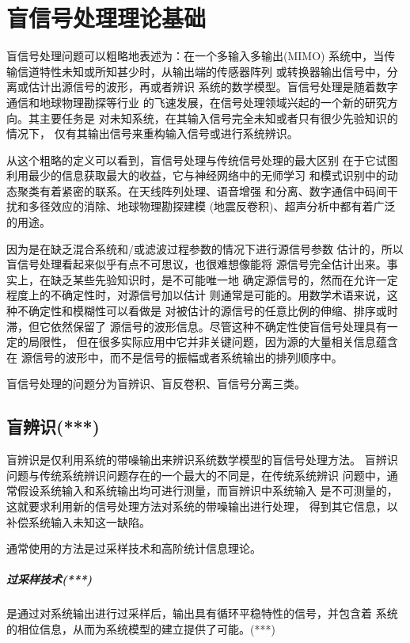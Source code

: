 ﻿%

\chapter{盲信号处理理论基础}
\label{chap01}


盲信号处理问题可以粗略地表述为：在一个多输入多输出(MIMO)
系统中，当传输信道特性未知或所知甚少时，从输出端的传感器阵列
或转换器输出信号中，分离或估计出源信号的波形，再或者辨识
系统的数学模型。盲信号处理是随着数字通信和地球物理勘探等行业
的飞速发展，在信号处理领域兴起的一个新的研究方向。其主要任务是
对未知系统，在其输入信号完全未知或者只有很少先验知识的情况下，
仅有其输出信号来重构输入信号或进行系统辨识。

从这个粗略的定义可以看到，盲信号处理与传统信号处理的最大区别
在于它试图利用最少的信息获取最大的收益，它与神经网络中的无师学习
和模式识别中的动态聚类有着紧密的联系。在天线阵列处理、语音增强
和分离、数字通信中码间干扰和多径效应的消除、地球物理勘探建模
(地震反卷积)、超声分析中都有着广泛的用途。

因为是在缺乏混合系统和/或滤波过程参数的情况下进行源信号参数
估计的，所以盲信号处理看起来似乎有点不可思议，也很难想像能将
源信号完全估计出来。事实上，在缺乏某些先验知识时，是不可能唯一地
确定源信号的，然而在允许一定程度上的不确定性时，对源信号加以估计
则通常是可能的。用数学术语来说，这种不确定性和模糊性可以看做是
对被估计的源信号的任意比例的伸缩、排序或时滞，但它依然保留了
源信号的波形信息。尽管这种不确定性使盲信号处理具有一定的局限性，
但在很多实际应用中它并非关键问题，因为源的大量相关信息蕴含在
源信号的波形中，而不是信号的振幅或者系统输出的排列顺序中。

盲信号处理的问题分为盲辨识、盲反卷积、盲信号分离三类。

\section{盲辨识(***)}
盲辨识是仅利用系统的带噪输出来辨识系统数学模型的盲信号处理方法。
盲辨识问题与传统系统辨识问题存在的一个最大的不同是，在传统系统辨识
问题中，通常假设系统输入和系统输出均可进行测量，而盲辨识中系统输入
是不可测量的，这就要求利用新的信号处理方法对系统的带噪输出进行处理，
得到其它信息，以补偿系统输入未知这一缺陷。

通常使用的方法是过采样技术和高阶统计信息理论。
\paragraph*{过采样技术(***)}
是通过对系统输出进行过采样后，输出具有循环平稳特性的信号，并包含着
系统的相位信息，从而为系统模型的建立提供了可能。(***)

